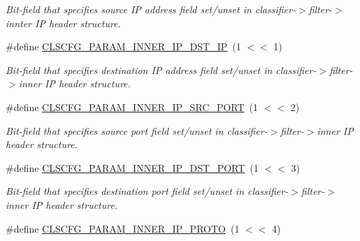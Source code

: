 \begin{DoxyCompactItemize}
\begin{DoxyCompactList}\small\item\em Bit-\/field that specifies source I\-P address field set/unset in classifier-\/$>$filter-\/$>$innter I\-P header structure. \end{DoxyCompactList}\item 
\hypertarget{group__FAPI__QOS__CLASS_gaea427f0d65c170b6ff19c2853f4103cc}{\#define \hyperlink{group__FAPI__QOS__CLASS_gaea427f0d65c170b6ff19c2853f4103cc}{C\-L\-S\-C\-F\-G\-\_\-\-P\-A\-R\-A\-M\-\_\-\-I\-N\-N\-E\-R\-\_\-\-I\-P\-\_\-\-D\-S\-T\-\_\-\-I\-P}~(1 $<$$<$ 1)}\label{group__FAPI__QOS__CLASS_gaea427f0d65c170b6ff19c2853f4103cc}

\begin{DoxyCompactList}\small\item\em Bit-\/field that specifies destination I\-P address field set/unset in classifier-\/$>$filter-\/$>$inner I\-P header structure. \end{DoxyCompactList}\item 
\hypertarget{group__FAPI__QOS__CLASS_ga5ba18b900992bae28b4d17deafcb477c}{\#define \hyperlink{group__FAPI__QOS__CLASS_ga5ba18b900992bae28b4d17deafcb477c}{C\-L\-S\-C\-F\-G\-\_\-\-P\-A\-R\-A\-M\-\_\-\-I\-N\-N\-E\-R\-\_\-\-I\-P\-\_\-\-S\-R\-C\-\_\-\-P\-O\-R\-T}~(1 $<$$<$ 2)}\label{group__FAPI__QOS__CLASS_ga5ba18b900992bae28b4d17deafcb477c}

\begin{DoxyCompactList}\small\item\em Bit-\/field that specifies source port field set/unset in classifier-\/$>$filter-\/$>$inner I\-P header structure. \end{DoxyCompactList}\item 
\hypertarget{group__FAPI__QOS__CLASS_gaf4e1e579a91bb86fdd5957b7b12c8874}{\#define \hyperlink{group__FAPI__QOS__CLASS_gaf4e1e579a91bb86fdd5957b7b12c8874}{C\-L\-S\-C\-F\-G\-\_\-\-P\-A\-R\-A\-M\-\_\-\-I\-N\-N\-E\-R\-\_\-\-I\-P\-\_\-\-D\-S\-T\-\_\-\-P\-O\-R\-T}~(1 $<$$<$ 3)}\label{group__FAPI__QOS__CLASS_gaf4e1e579a91bb86fdd5957b7b12c8874}

\begin{DoxyCompactList}\small\item\em Bit-\/field that specifies destination port field set/unset in classifier-\/$>$filter-\/$>$inner I\-P header structure. \end{DoxyCompactList}\item 
\hypertarget{group__FAPI__QOS__CLASS_ga8dc01954dd284e27b4d88ba16f01a858}{\#define \hyperlink{group__FAPI__QOS__CLASS_ga8dc01954dd284e27b4d88ba16f01a858}{C\-L\-S\-C\-F\-G\-\_\-\-P\-A\-R\-A\-M\-\_\-\-I\-N\-N\-E\-R\-\_\-\-I\-P\-\_\-\-P\-R\-O\-T\-O}~(1 $<$$<$ 4)}\label{group__FAPI__QOS__CLASS_ga8dc01954dd284e27b4d88ba16f01a858}


\end{DoxyCompactItemize}
